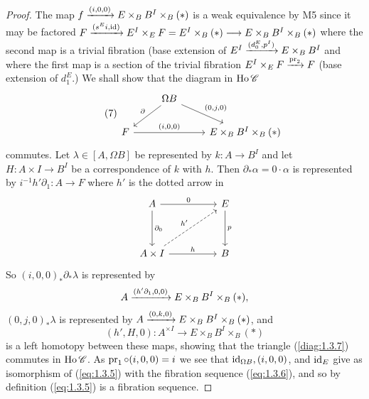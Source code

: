 \documentclass[../main]{subfiles}
\begin{document}
\begin{proof}
 The map $f \varrightarrow{(i,0,0)} E \times_B B^I \times_B (*)$ is a weak equivalence by M5 since it may be factored $F \varrightarrow{(s^Ei,\id)} E^I\times_E F = E^I \times_B(*) \longrightarrow E \times_B B^I \times_B(*)$ where the second map is a trivial fibration (base extension of $E^I \varrightarrow{(d^E_0,p^I)} E \times_B B^I$ and where the first map is a section of the trivial fibration $E^I \times_E F \varrightarrow{\pr_2} F$ (base extension of $d^E_1$.)  We shall show that the diagram in $\operatorname{Ho} \mathscr{C}$
\[\tag{7}\label{diag:1.3.7}
\begin{tikzcd}
    \phantom{1} & \Omega B \arrow[dl, swap, "\partial"] \arrow[dr, "{(0,j,0)}"] \\
    F \arrow[rr,"{(i,0,0)}"] & & E \times_B B^I \times_B (*)
\end{tikzcd}
\]
commutes.  Let $\lambda \in [A,\Omega B]$  be represented by $k:A \longrightarrow B^I$ and let\\ $H:A \times I \longrightarrow B^I$ be a correspondence of $k$ with $h$.  Then $\partial_* \alpha = 0 \cdot \alpha$ is represented by $i^{-1}h'\partial_1:A \longrightarrow F$ where $h'$ is the dotted arrow in
\[
\begin{tikzcd}
    A \arrow[dd, "\partial_0"] \arrow[rr, "0"]
        && E \arrow[dd,"p"] \\ \\
    A \times I \arrow[rruu, dashed, "h'"] \arrow[rr,"h"]
        && B 
\end{tikzcd}
\]
So $(i,0,0)_*\partial_*\lambda$ is represented by \[A \varrightarrow{(h'\partial_1,0,0)} E \times_B B^I \times_B (*),\]
$(0,j,0)_*\lambda$ is represented by $A \varrightarrow{(0,k,0)} E \times_B B^I \times_B (*)$, and
\[(h',H,0):A^{\times I} \longrightarrow E \times_B B^I \times_B (*)\] is a left homotopy between these maps, showing that the triangle (\ref{diag:1.3.7}) commutes in $\operatorname{Ho} \mathscr{C}$.  As $\operatorname{pr}_1 \circ (i,0,0) = i$ we see that $\operatorname{id}_{\Omega B}, (i,0,0)$, and $\operatorname{id}_E$ give as isomorphism of (\ref{eq:1.3.5}) with the fibration sequence (\ref{eq:1.3.6}), and so by definition (\ref{eq:1.3.5}) is a fibration sequence.
\end{proof}
\end{document}
